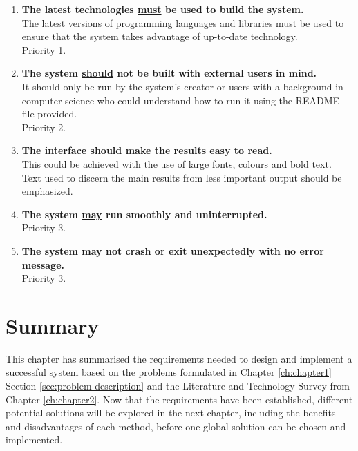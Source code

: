 \begin{enumerate}[label=NF\arabic*]

    \item \textbf{The latest technologies \underline{must} be used to build the system.}\\
	The latest versions of programming languages and libraries must be used to ensure that the system takes advantage of up-to-date technology.\\
	Priority 1.
	
	\item \textbf{The system \underline{should} not be built with external users in mind.}\\
	It should only be run by the system's creator or users with a background in computer science who could understand how to run it using the README file provided.\\
	Priority 2.

    \item \textbf{The interface \underline{should} make the results easy to read.}\\
    This could be achieved with the use of large fonts, colours and bold text. Text used to discern the main results from less important output should be emphasized.
    
    \item \textbf{The system \underline{may} run smoothly and uninterrupted.}\\
    Priority 3.
    
    \item \textbf{The system \underline{may} not crash or exit unexpectedly with no error message.}\\
    Priority 3.

\end{enumerate}

\section{Summary}

This chapter has summarised the requirements needed to design and implement a successful system based on the problems formulated in Chapter \ref{ch:chapter1} Section \ref{sec:problem-description} and the Literature and Technology Survey from Chapter \ref{ch:chapter2}. Now that the requirements have been established, different potential solutions will be explored in the next chapter, including the benefits and disadvantages of each method, before one global solution can be chosen and implemented.
